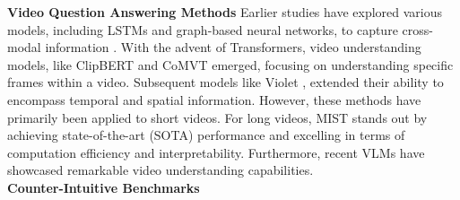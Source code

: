 \noindent\textbf{Video Question Answering Methods}\quad
Earlier studies have explored various models, including LSTMs and graph-based neural networks, to capture cross-modal information \cite{li2019beyond, zhao2018open}. With the advent of Transformers, video understanding models, like ClipBERT \cite{leiless} and CoMVT \cite{seo2021look} emerged, focusing on understanding specific frames within a video. Subsequent models like Violet \cite{fu2021violet}, extended their ability to encompass temporal and spatial information. However, these methods have primarily been applied to short videos. For long videos, MIST \cite{gao2022mist} stands out by achieving state-of-the-art (SOTA) performance and excelling in terms of computation efficiency and interpretability. Furthermore, recent VLMs \cite{li2023otter,2023videochat,maaz2023videochatgpt} have showcased remarkable video understanding capabilities.\\
\noindent\textbf{Counter-Intuitive Benchmarks}\quad
